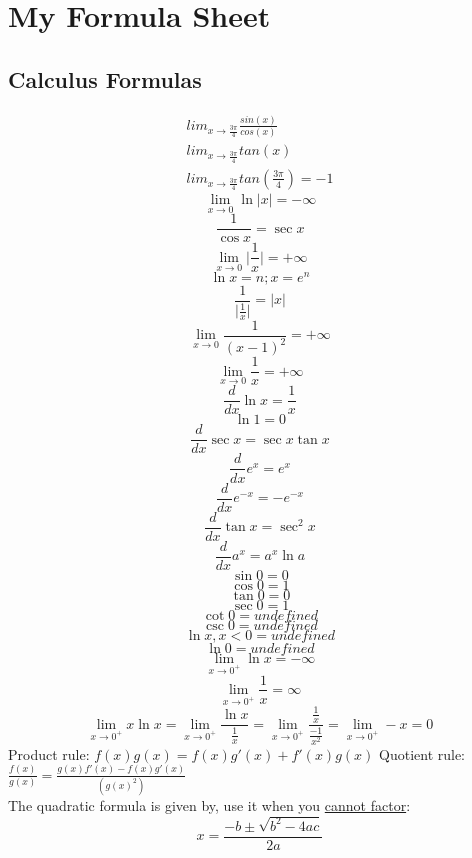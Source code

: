 \documentclass{article}
\begin{document}
\section*{My Formula Sheet}

\subsection*{Calculus Formulas}
\begin{align}
   lim_{x \to \frac{3\pi}{4}} \frac{sin(x)}{cos(x)}\\
   lim_{x \to \frac{3\pi}{4}} tan(x)\\
   lim_{x \to \frac{3\pi}{4}} tan(\frac{3\pi}{4}) = -1
\end{align}
\[\lim_{x \to 0} \ln{ \lvert x \rvert} = -\infty \]
\[\frac{1}{\cos{x}} = \sec{x}\]
\[\lim_{x \to 0} \lvert \frac{1}{x} \rvert = +\infty \] 
\[\ln{x}=n; x = e^{n}\]
\[\frac{1}{\lvert \frac{1}{x} \rvert} = \lvert x \rvert\]
\[\lim_{x \to 0}\frac{1}{(x-1)^2}=+\infty\]
\[\lim_{x \to 0}\frac{1}{x}=+\infty\]
\[\frac{d}{dx} \ln{x} = \frac{1}{x}\]
\[\ln{1} = 0\]
\[\frac{d}{dx} \sec{x} = \sec{x} \tan{x}\]
\[\frac{d}{dx} e^x = e^x\]
\[\frac{d}{dx} e^{-x} = -e^{-x}\]
\[\frac{d}{dx} \tan{x} = \sec^2{x}\]
\[\frac{d}{dx} a^x = a^x \ln{a}\]
\[\sin{0} = 0\]
\[\cos{0} = 1\]
\[\tan{0} = 0\]
\[\sec{0} = 1\]
\[\cot{0} = undefined\]
\[\csc{0} = undefined\]
\[\ln{x}, x<0 = undefined\]
\[\ln{0} = undefined\]
\[\lim_{x \to 0^+} \ln{x} = -\infty\]
\[\lim_{x \to 0^+} \frac{1}{x} = \infty\]
\[\lim_{x \to 0^+} x \ln{x} = \lim_{x \to 0^+} \frac{\ln{x}}{\frac{1}{x}} = \lim_{x \to 0^+} \frac{\frac{1}{x}}{\frac{-1}{x^2}} = \lim_{x \to 0^+} -x = 0\]
Product rule: \(f(x)g(x) = f(x)g'(x)+f'(x)g(x)\)
Quotient rule: \(\frac{f(x)}{g(x)} = \frac{g(x)f'(x)-f(x)g'(x)}{(g(x)^2)}\)\\
\newline
The quadratic formula is given by, use it when you \underline{cannot factor}:
\[ x = \frac{-b \pm \sqrt{b^2 - 4ac}}{2a} \]
\end{document}
